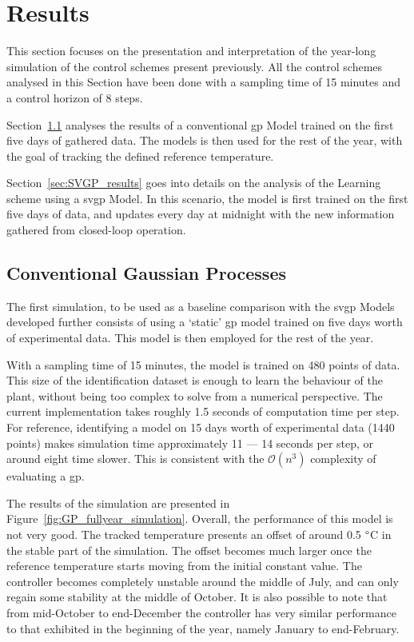 \section{Results}\label{sec:results}


This section focuses on the presentation and interpretation of the year-long
simulation of the control schemes present previously. All the control schemes
analysed in this Section have been done with a sampling time of 15 minutes and a
control horizon of 8 steps.

Section~\ref{sec:GP_results} analyses the results of a conventional
\acrlong{gp} Model trained on the first five days of gathered data. The models
is then used for the rest of the year, with the goal of tracking the defined
reference temperature.

Section~\ref{sec:SVGP_results} goes into details on the analysis of the Learning
scheme using a \acrshort{svgp} Model. In this scenario, the model is first
trained on the first five days of data, and updates every day at midnight with
the new information gathered from closed-loop operation.

\subsection{Conventional Gaussian Processes}\label{sec:GP_results}

The first simulation, to be used as a baseline comparison with the
\acrshort{svgp} Models developed further consists of using a `static'
\acrshort{gp} model trained on five days worth of experimental data. This model
is then employed for the rest of the year.

With a sampling time of 15 minutes, the model is trained on 480 points of data.
This size of the identification dataset is enough to learn the behaviour of the
plant, without being too complex to solve from a numerical perspective. The
current implementation takes roughly 1.5 seconds of computation time per step.
For reference, identifying a model on 15 days worth of experimental data (1440
points) makes simulation time approximately 11 --- 14 seconds per step, or
around eight time slower. This is consistent with the $\mathcal{O}(n^3)$
complexity of evaluating a \acrshort{gp}.

The results of the simulation are presented in
Figure~\ref{fig:GP_fullyear_simulation}. Overall, the performance of this model
is not very good. The tracked temperature presents an offset of around 0.5
$\degree$C in the stable part of the simulation. The offset becomes much larger
once the reference temperature starts moving from the initial constant value.
The controller becomes completely unstable around the middle of July, and can
only regain some stability at the middle of October. It is also possible to note
that from mid-October to end-December the controller has very similar
performance to that exhibited in the beginning of the year, namely January to
end-February.

